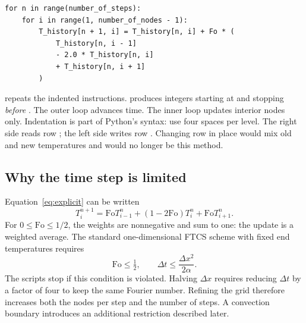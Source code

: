 \documentclass[11pt,letterpaper]{article}
\newcommand{\Fo}{\mathrm{Fo}}
\newcommand{\code}[1]{\texttt{\detokenize{#1}}}
\begin{document}
\begin{lstlisting}
for n in range(number_of_steps):
    for i in range(1, number_of_nodes - 1):
        T_history[n + 1, i] = T_history[n, i] + Fo * (
            T_history[n, i - 1]
            - 2.0 * T_history[n, i]
            + T_history[n, i + 1]
        )
\end{lstlisting}
\code{for} repeats the indented instructions. \code{range(a, b)} produces
integers starting at \code{a} and stopping \emph{before} \code{b}.
The outer loop advances time. The inner loop updates interior nodes only.
Indentation is part of Python's syntax: use four spaces per level.
The right side reads row \code{n}; the left side writes row \code{n + 1}.
Changing row \code{n} in place would mix old and new temperatures and
would no longer be this method.


\subsection*{Why the time step is limited}
Equation~\eqref{eq:explicit} can be written
\[
 T_i^{n+1}=\Fo T_{i-1}^n+(1-2\Fo)T_i^n+\Fo T_{i+1}^n.
\]
For $0\le\Fo\le1/2$, the weights are nonnegative and sum to one:
the update is a weighted average. The standard one-dimensional FTCS
scheme with fixed end temperatures requires
\[
 \Fo\le\tfrac12,\qquad \Delta t\le\frac{\Delta x^2}{2\alpha}.
\]
The scripts stop if this condition is violated. Halving $\Delta x$ requires
reducing $\Delta t$ by a factor of four to keep the same Fourier number.
Refining the grid therefore increases both the nodes per step and the
number of steps. A convection boundary introduces an additional restriction
described later.
\end{document}
